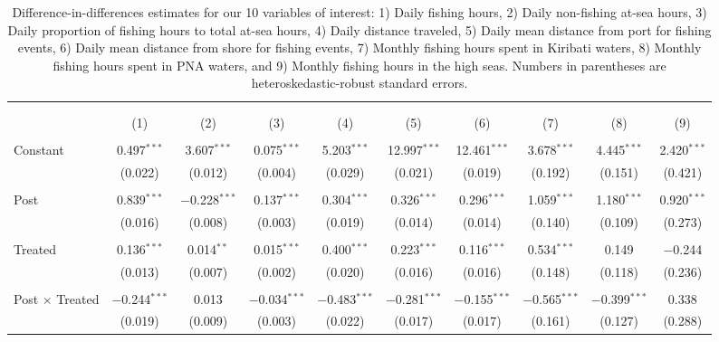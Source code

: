 
\begin{table}[!htbp] \centering 
  \caption{\label{tab:main_DID}Difference-in-differences estimates for our 10 variables of interest: 1) Daily fishing hours, 2) Daily non-fishing at-sea hours, 3) Daily proportion of fishing hours to total at-sea hours, 4) Daily distance traveled, 5) Daily mean distance from port for fishing events, 6) Daily mean distance from shore for fishing events, 7) Monthly fishing hours spent in Kiribati waters, 8) Monthly fishing hours spent in PNA waters, and 9) Monthly fishing hours in the high seas. Numbers in parentheses are heteroskedastic-robust standard errors.} 
  \label{} 
\footnotesize 
\begin{tabular}{@{\extracolsep{1pt}}lccccccccc} 
\\[-1.8ex]\hline 
\hline \\[-1.8ex] 
\\[-1.8ex] & (1) & (2) & (3) & (4) & (5) & (6) & (7) & (8) & (9)\\ 
\hline \\[-1.8ex] 
 Constant & 0.497$^{***}$ & 3.607$^{***}$ & 0.075$^{***}$ & 5.203$^{***}$ & 12.997$^{***}$ & 12.461$^{***}$ & 3.678$^{***}$ & 4.445$^{***}$ & 2.420$^{***}$ \\ 
  & (0.022) & (0.012) & (0.004) & (0.029) & (0.021) & (0.019) & (0.192) & (0.151) & (0.421) \\ 
  & & & & & & & & & \\ 
 Post & 0.839$^{***}$ & $-$0.228$^{***}$ & 0.137$^{***}$ & 0.304$^{***}$ & 0.326$^{***}$ & 0.296$^{***}$ & 1.059$^{***}$ & 1.180$^{***}$ & 0.920$^{***}$ \\ 
  & (0.016) & (0.008) & (0.003) & (0.019) & (0.014) & (0.014) & (0.140) & (0.109) & (0.273) \\ 
  & & & & & & & & & \\ 
 Treated & 0.136$^{***}$ & 0.014$^{**}$ & 0.015$^{***}$ & 0.400$^{***}$ & 0.223$^{***}$ & 0.116$^{***}$ & 0.534$^{***}$ & 0.149 & $-$0.244 \\ 
  & (0.013) & (0.007) & (0.002) & (0.020) & (0.016) & (0.016) & (0.148) & (0.118) & (0.236) \\ 
  & & & & & & & & & \\ 
 Post $\times$ Treated & $-$0.244$^{***}$ & 0.013 & $-$0.034$^{***}$ & $-$0.483$^{***}$ & $-$0.281$^{***}$ & $-$0.155$^{***}$ & $-$0.565$^{***}$ & $-$0.399$^{***}$ & 0.338 \\ 
  & (0.019) & (0.009) & (0.003) & (0.022) & (0.017) & (0.017) & (0.161) & (0.127) & (0.288) \\ 

\end{tabular}
\end{table}

